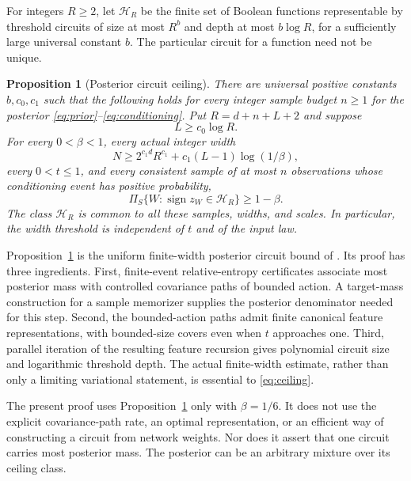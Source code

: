 \documentclass[11pt]{article}
\newtheorem{proposition}[theorem]{Proposition}
\theoremstyle{remark}\newtheorem{remark}[theorem]{Remark}
\newcommand{\sgn}{\operatorname{sign}}
\begin{document}
For integers $R\ge2$, let $\mathcal H_R$ be the finite set of Boolean
functions representable by threshold circuits of size at most $R^b$ and
depth at most $b\log R$, for a sufficiently large universal constant $b$.
The particular circuit for a function need not be unique.

\begin{proposition}[Posterior circuit ceiling]\label{prop:ceiling}
There are universal positive constants $b,c_0,c_1$ such that the following
holds for every integer sample budget $n\ge1$ for the posterior \eqref{eq:prior}--\eqref{eq:conditioning}.
Put $R=d+n+L+2$ and suppose
\begin{equation}\label{eq:padding}
 L\ge c_0\log R.
\end{equation}
For every $0<\beta<1$, every actual integer width
\begin{equation}\label{eq:width}
 N\ge 2^{c_1d}R^{c_1}+c_1(L-1)\log(1/\beta),
\end{equation}
every $0<t\le1$, and every consistent sample of at most $n$ observations
whose conditioning event has positive probability,
\begin{equation}\label{eq:ceiling}
 \Pi_S\{W:\sgn z_W\in\mathcal H_R\}\ge1-\beta.
\end{equation}
The class $\mathcal H_R$ is common to all these samples, widths, and
scales. In particular, the width threshold is independent of $t$ and
of the input law.
\end{proposition}

Proposition~\ref{prop:ceiling} is the uniform finite-width posterior
circuit bound of \cite{barriers}. Its proof has three ingredients. First,
finite-event relative-entropy certificates associate most posterior mass
with controlled covariance paths of bounded action. A target-mass
construction for a sample memorizer supplies the posterior denominator
needed for this step. Second, the bounded-action paths admit finite
canonical feature representations, with bounded-size covers even when
$t$ approaches one. Third, parallel iteration of the resulting feature
recursion gives polynomial circuit size and logarithmic threshold depth.
The actual finite-width estimate, rather than only a limiting variational
statement, is essential to \eqref{eq:ceiling}.

The present proof uses Proposition~\ref{prop:ceiling} only with
$\beta=1/6$. It does not use the explicit covariance-path rate, an
optimal representation, or an efficient way of constructing a circuit
from network weights. Nor does it assert that one circuit carries most
posterior mass. The posterior can be an arbitrary mixture over its
ceiling class.
\end{document}
